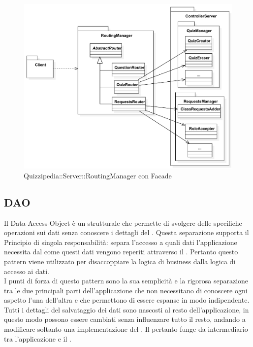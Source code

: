 \documentclass[a4paper, titlepage]{article}
\begin{document}
\begin{figure}[htp]
\centering
\includegraphics[scale=0.70]{Img/FACADE.pdf}
\caption{Quizzipedia::Server::RoutingManager con Facade}
\label{}
\end{figure}

\subsection{DAO}
Il Data-Access-Object è un  strutturale che permette di svolgere delle specifiche operazioni sui dati senza conoscere i dettagli del . Questa separazione supporta il Principio di singola responsabilità: separa l'accesso a quali dati l'applicazione necessita dal come questi dati vengono reperiti attraverso il .
Pertanto questo pattern viene utilizzato per disaccoppiare la logica di business dalla logica di accesso ai dati. 
\\ I punti di forza di questo pattern sono la sua semplicità e la rigorosa separazione tra le due principali parti dell'applicazione che non necessitano di conoscere ogni aspetto l'una dell'altra e che permettono di essere espanse in modo indipendente.
\\ Tutti i dettagli del salvataggio dei dati sono nascosti al resto dell'applicazione, in questo modo possono essere cambiati senza influenzare tutto il resto, andando a modificare soltanto una implementazione del .
\newline Il  pertanto funge da intermediario tra l'applicazione e il .
\end{document}
